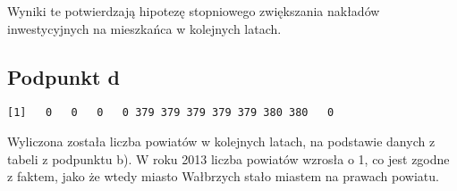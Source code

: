 Wyniki te potwierdzają hipotezę stopniowego zwiększania nakładów inwestycyjnych na mieszkańca
w kolejnych latach.

\subsection*{Podpunkt d}

\begin{verbatim}
[1]   0   0   0   0 379 379 379 379 379 380 380   0
\end{verbatim}

Wyliczona została liczba powiatów w kolejnych latach, na podstawie danych z tabeli z podpunktu b).
W roku 2013 liczba powiatów wzrosła o 1, co jest zgodne z faktem,
jako że wtedy miasto Wałbrzych stało miastem na prawach powiatu.





